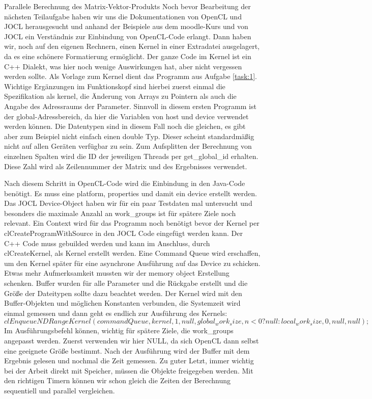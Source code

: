 \documentclass[
ngerman,
subtask=ruled %
]{tudaexercise}
\begin{document}
	
	\begin{task}{Parallele Berechnung des Matrix-Vektor-Produkts}
		Noch bevor Bearbeitung der nächsten Teilaufgabe haben wir uns die Dokumentationen von OpenCL und JOCL herausgesucht und anhand der Beispiele aus dem moodle-Kurs und von JOCL ein Verständnis zur Einbindung von OpenCL-Code erlangt.
		Dann haben wir, noch auf den eigenen Rechnern, einen Kernel in einer Extradatei ausgelagert, da es eine schönere Formatierung ermöglicht.
		Der ganze Code im Kernel ist ein C++ Dialekt, was hier noch wenige Auswirkungen hat, aber nicht vergessen werden sollte.
		Als Vorlage zum Kernel dient das Programm aus Aufgabe \ref{task:1}. Wichtige Ergänzungen im Funktionskopf sind hierbei zuerst einmal die Spezifikation als kernel, die Änderung von Arrays zu Pointern als auch die Angabe des Adressraums der Parameter.
		Sinnvoll in diesem ersten Programm ist der global-Adressbereich, da hier die Variablen von host und device verwendet werden können.
		Die Datentypen sind in diesem Fall noch die gleichen, es gibt aber zum Beispiel nicht einfach einen double Typ. Dieser scheint standardmäßig nicht auf allen Geräten verfügbar zu sein.
		Zum Aufsplitten der Berechnung von einzelnen Spalten wird die ID der jeweiligen Threads per get\_global\_id erhalten.
		Diese Zahl wird als Zeilennummer der Matrix und des Ergebnisses verwendet.
		
		Nach diesem Schritt in OpenCL-Code wird die Einbindung in den Java-Code benötigt.
		Es muss eine platform, properties und damit ein device erstellt werden. Das JOCL Device-Object haben wir für ein paar Testdaten mal untersucht und besonders die maximale Anzahl an work\_groups ist für spätere Ziele noch relevant.
		Ein Context wird für das Programm noch benötigt bevor der Kernel per clCreateProgramWithSource in den JOCL Code eingefügt werden kann.
		Der C++ Code muss gebuilded werden und kann im Anschluss, durch clCreateKernel, als Kernel erstellt werden.
		Eine Command Queue wird erschaffen, um den Kernel später für eine asynchrone Ausführung auf das Device zu schicken.
		Etwas mehr Aufmerksamkeit mussten wir der memory object Erstellung schenken. Buffer wurden für alle Parameter und die Rückgabe erstellt und die Größe der Dateitypen sollte dazu beachtet werden.
		Der Kernel wird mit den Buffer-Objekten und möglichen Konstanten verbunden, die Systemzeit wird einmal gemessen und dann geht es endlich zur Ausführung des Kernels:
		$clEnqueueNDRangeKernel(commandQueue, kernel, 1, null,
		global_work_size, n < 0 ? null: local_work_size,
		0, null, null);$
		Im Ausführungsbefehl können, wichtig für spätere Ziele, die work\_groups angepasst werden. Zuerst verwenden wir hier NULL, da sich OpenCL dann selbst eine geeignete Größe bestimmt.
		Nach der Ausführung wird der Buffer mit dem Ergebnis gelesen und nochmal die Zeit gemessen.
		Zu guter Letzt, immer wichtig bei der Arbeit direkt mit Speicher, müssen die Objekte freigegeben werden.
		Mit den richtigen Timern können wir schon gleich die Zeiten der Berechnung sequentiell und parallel vergleichen.
	\end{task}
	
\end{document}
